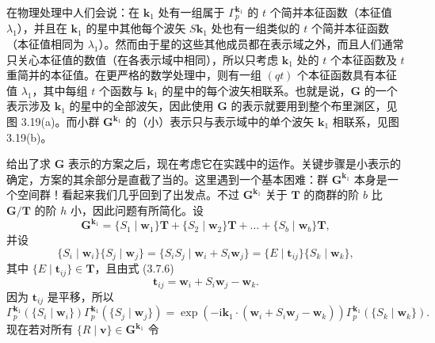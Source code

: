 在物理处理中人们会说：在 $\mathbf{k}_{1}$ 处有一组属于 $\Gamma^{\mathbf{k}_{1}}_{p}$ 的 $t$ 个简并本征函数（本征值 $\lambda_{1}$），并且在 $\mathbf{k}_{1}$ 的星中其他每个波矢 $S\mathbf{k}_{1}$ 处也有一组类似的 $t$ 个简并本征函数（本征值相同为 $\lambda_{1}$）。然而由于星的这些其他成员都在表示域之外，而且人们通常只关心本征值的数值（在各表示域中相同），所以只考虑 $\mathbf{k}_{1}$ 处的 $t$ 个本征函数及 $t$ 重简并的本征值。在更严格的数学处理中，则有一组 $(qt)$ 个本征函数具有本征值 $\lambda_{1}$，其中每组 $t$ 个函数与 $\mathbf{k}_{1}$ 的星中的每个波矢相联系。也就是说，$\mathbf{G}$ 的一个表示涉及 $\mathbf{k}_{1}$ 的星中的全部波矢，因此使用 $\mathbf{G}$ 的表示就要用到整个布里渊区，见图 3.19(a)。而小群 $\mathbf{G}^{\mathbf{k}_{1}}$ 的（小）表示只与表示域中的单个波矢 $\mathbf{k}_{1}$ 相联系，见图 3.19(b)。

给出了求 $\mathbf{G}$ 表示的方案之后，现在考虑它在实践中的运作。关键步骤是小表示的确定，方案的其余部分是直截了当的。这里遇到一个基本困难：群 $\mathbf{G}^{\mathbf{k}_{1}}$ 本身是一个空间群！看起来我们几乎回到了出发点。不过 $\mathbf{G}^{\mathbf{k}_{1}}$ 关于 $\mathbf{T}$ 的商群的阶 $b$ 比 $\mathbf{G}/\mathbf{T}$ 的阶 $h$ 小，因此问题有所简化。设
\begin{equation*}
\mathbf{G}^{\mathbf{k}_{1}} = \{S_{1} \mid \mathbf{w}_{1}\}\mathbf{T} + \{S_{2} \mid \mathbf{w}_{2}\}\mathbf{T} + \dots + \{S_{b} \mid \mathbf{w}_{b}\}\mathbf{T},
\tag{3.7.5}
\end{equation*}
并设
\begin{equation*}
\{S_{i} \mid \mathbf{w}_{i}\}\{S_{j} \mid \mathbf{w}_{j}\} = \{S_{i}S_{j} \mid \mathbf{w}_{i} + S_{i}\mathbf{w}_{j}\} = \{E \mid \mathbf{t}_{ij}\}\{S_{k} \mid \mathbf{w}_{k}\},
\tag{3.7.6}
\end{equation*}
其中 $\{E \mid \mathbf{t}_{ij}\} \in \mathbf{T}$，且由式 (3.7.6)
\begin{equation*}
\mathbf{t}_{ij} = \mathbf{w}_{i} + S_{i}\mathbf{w}_{j} - \mathbf{w}_{k}.
\tag{3.7.7}
\end{equation*}
因为 $\mathbf{t}_{ij}$ 是平移，所以
\begin{equation*}
\Gamma^{\mathbf{k}_{1}}_{p}\left(\{S_{i} \mid \mathbf{w}_{i}\}\right)\Gamma^{\mathbf{k}_{1}}_{p}\left(\{S_{j} \mid \mathbf{w}_{j}\}\right) = \exp\left(-\mathrm{i}\mathbf{k}_{1} \cdot (\mathbf{w}_{i} + S_{i}\mathbf{w}_{j} - \mathbf{w}_{k})\right)\Gamma^{\mathbf{k}_{1}}_{p}\left(\{S_{k} \mid \mathbf{w}_{k}\}\right).
\tag{3.7.8}
\end{equation*}
现在若对所有 $\{R \mid \mathbf{v}\} \in \mathbf{G}^{\mathbf{k}_{1}}$ 令
